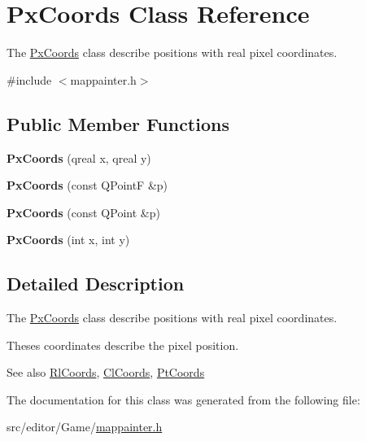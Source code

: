 \hypertarget{class_px_coords}{\section{\-Px\-Coords \-Class \-Reference}
\label{class_px_coords}
}


\-The \hyperlink{class_px_coords}{\-Px\-Coords} class describe positions with real pixel coordinates.  




{\ttfamily \#include $<$mappainter.\-h$>$}

\subsection*{\-Public \-Member \-Functions}
\begin{DoxyCompactItemize}
\item 
\hypertarget{class_px_coords_af7f17b5bb6fa3261162b4fb5df854236}{{\bfseries \-Px\-Coords} (qreal x, qreal y)}\label{class_px_coords_af7f17b5bb6fa3261162b4fb5df854236}

\item 
\hypertarget{class_px_coords_a589dea0fc7f89609399528ce47788b74}{{\bfseries \-Px\-Coords} (const \-Q\-Point\-F \&p)}\label{class_px_coords_a589dea0fc7f89609399528ce47788b74}

\item 
\hypertarget{class_px_coords_ad38e146a7d9908ac31ddae47a1b765ff}{{\bfseries \-Px\-Coords} (const \-Q\-Point \&p)}\label{class_px_coords_ad38e146a7d9908ac31ddae47a1b765ff}

\item 
\hypertarget{class_px_coords_a258b2927d40dc866bfbdd0d02a0afa31}{{\bfseries \-Px\-Coords} (int x, int y)}\label{class_px_coords_a258b2927d40dc866bfbdd0d02a0afa31}

\end{DoxyCompactItemize}


\subsection{\-Detailed \-Description}
\-The \hyperlink{class_px_coords}{\-Px\-Coords} class describe positions with real pixel coordinates. 

\-Theses coordinates describe the pixel position.

\begin{DoxySeeAlso}{\-See also}
\hyperlink{class_rl_coords}{\-Rl\-Coords}, \hyperlink{class_cl_coords}{\-Cl\-Coords}, \hyperlink{class_pt_coords}{\-Pt\-Coords} 
\end{DoxySeeAlso}


\-The documentation for this class was generated from the following file\-:\begin{DoxyCompactItemize}
\item 
src/editor/\-Game/\hyperlink{mappainter_8h}{mappainter.\-h}\end{DoxyCompactItemize}

